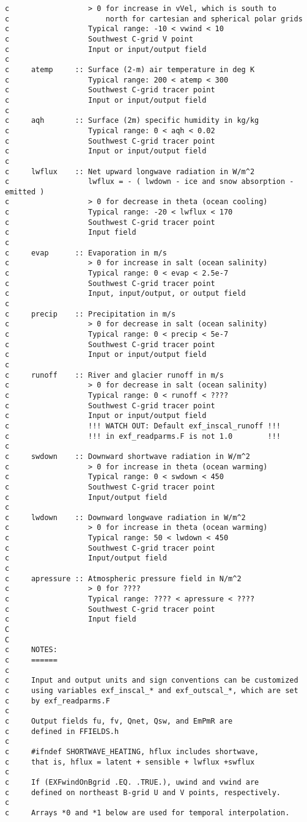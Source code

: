 {\begin{verbatim}
c                  > 0 for increase in vVel, which is south to
c                      north for cartesian and spherical polar grids
c                  Typical range: -10 < vwind < 10
c                  Southwest C-grid V point
c                  Input or input/output field
c
c     atemp     :: Surface (2-m) air temperature in deg K
c                  Typical range: 200 < atemp < 300
c                  Southwest C-grid tracer point
c                  Input or input/output field
c
c     aqh       :: Surface (2m) specific humidity in kg/kg
c                  Typical range: 0 < aqh < 0.02
c                  Southwest C-grid tracer point
c                  Input or input/output field
c
c     lwflux    :: Net upward longwave radiation in W/m^2
c                  lwflux = - ( lwdown - ice and snow absorption - emitted )
c                  > 0 for decrease in theta (ocean cooling)
c                  Typical range: -20 < lwflux < 170
c                  Southwest C-grid tracer point
c                  Input field
c
c     evap      :: Evaporation in m/s
c                  > 0 for increase in salt (ocean salinity)
c                  Typical range: 0 < evap < 2.5e-7
c                  Southwest C-grid tracer point
c                  Input, input/output, or output field
c
c     precip    :: Precipitation in m/s
c                  > 0 for decrease in salt (ocean salinity)
c                  Typical range: 0 < precip < 5e-7
c                  Southwest C-grid tracer point
c                  Input or input/output field
c
c     runoff    :: River and glacier runoff in m/s
c                  > 0 for decrease in salt (ocean salinity)
c                  Typical range: 0 < runoff < ????
c                  Southwest C-grid tracer point
c                  Input or input/output field
c                  !!! WATCH OUT: Default exf_inscal_runoff !!!
c                  !!! in exf_readparms.F is not 1.0        !!!
c
c     swdown    :: Downward shortwave radiation in W/m^2
c                  > 0 for increase in theta (ocean warming)
c                  Typical range: 0 < swdown < 450
c                  Southwest C-grid tracer point
c                  Input/output field
c
c     lwdown    :: Downward longwave radiation in W/m^2
c                  > 0 for increase in theta (ocean warming)
c                  Typical range: 50 < lwdown < 450
c                  Southwest C-grid tracer point
c                  Input/output field
c
c     apressure :: Atmospheric pressure field in N/m^2
c                  > 0 for ????
c                  Typical range: ???? < apressure < ????
c                  Southwest C-grid tracer point
c                  Input field
C
C
c     NOTES:
c     ======
c
c     Input and output units and sign conventions can be customized
c     using variables exf_inscal_* and exf_outscal_*, which are set
c     by exf_readparms.F
c
c     Output fields fu, fv, Qnet, Qsw, and EmPmR are
c     defined in FFIELDS.h
c
c     #ifndef SHORTWAVE_HEATING, hflux includes shortwave,
c     that is, hflux = latent + sensible + lwflux +swflux
c
c     If (EXFwindOnBgrid .EQ. .TRUE.), uwind and vwind are
c     defined on northeast B-grid U and V points, respectively.
c
c     Arrays *0 and *1 below are used for temporal interpolation.
\end{verbatim}
}

